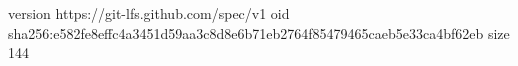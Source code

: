 version https://git-lfs.github.com/spec/v1
oid sha256:e582fe8effc4a3451d59aa3c8d8e6b71eb2764f85479465caeb5e33ca4bf62eb
size 144
